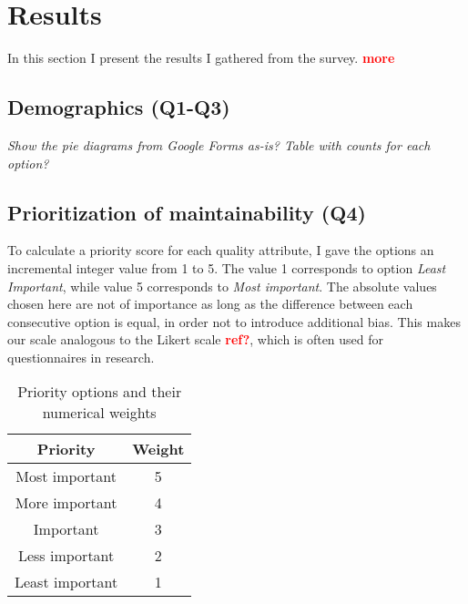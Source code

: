 \documentclass[utf8,english]{gradu3}
\newcommand{\todo}[1]{\textbf{\textcolor{red}{#1}}}
\newcommand{\tmp}[1]{\textit{{#1}}}
\begin{document}
\chapter{Results}

In this section I present the results I gathered from the survey. \todo{more}

\section{Demographics (Q1-Q3)}

\tmp{
  Show the pie diagrams from Google Forms as-is? Table with counts for each option?
}

\section{Prioritization of maintainability (Q4)}

To calculate a priority score for each quality attribute, I gave the options an incremental integer value from 1 to 5.
The value 1 corresponds to option \textit{Least Important}, while value 5 corresponds to \textit{Most important}.
The absolute values chosen here are not of importance as long as the difference between each consecutive option is equal,
in order not to introduce additional bias.
This makes our scale analogous to the Likert scale \todo{ref?}, which is often used for questionnaires in research.


\begin{table}[!h]
  \begin{center}
    \caption{Priority options and their numerical weights}
    \label{table:priorities1}
    \begin{tabular}{|c|c|}
      \hline
      \textbf{Priority} & \textbf{Weight} \\
      \hline
      Most important    & 5               \\
      More important    & 4               \\
      Important         & 3               \\
      Less important    & 2               \\
      Least important   & 1               \\
      \hline
    \end{tabular}
  \end{center}
\end{table}
\end{document}
